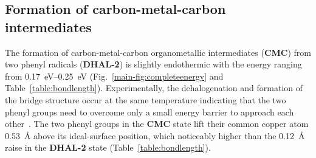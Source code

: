 \documentclass[aps,prl,reprint,amsmath,amssymb,floatfix,notitlepage]{revtex4-1}
\begin{document}
\ifdefined\INTERAL
\subsection{Formation of carbon-metal-carbon intermediates}
\fi

The formation of carbon-metal-carbon organometallic intermediates (\textbf{CMC}) from two phenyl radicals (\textbf{DHAL-2}) is slightly endothermic with the energy ranging from \SIrange{0.17}{0.25}{\electronvolt} (Fig.~\ref{main-fig:completeenergy} and Table~\ref{table:bondlength}). Experimentally, the dehalogenation and formation of the bridge structure occur at the same temperature indicating that the two phenyl groups need to overcome only a small energy barrier to approach each other~\cite{ullmann_88}. 
%
The two phenyl groups in the \textbf{CMC} state lift their common copper atom \SI{0.53}{\angstrom} above its ideal-surface position, which noticeably higher than the \SI{0.12}{\angstrom} raise in the \textbf{DHAL-2} state (Table~\ref{table:bondlength}).



\end{document}
